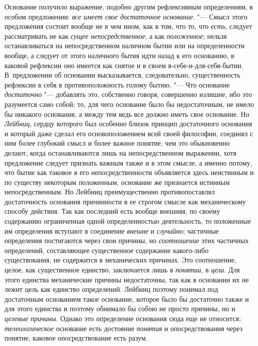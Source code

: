 Основание получило выражение, подобно другим рефлексивным определениям, в
особом предложении: {\em все имеет свое достаточное
основание}. "--- Смысл этого предложения состоит вообще не в чем ином, как в
том, что то, что {\em есть}, следует рассматривать не
как {\em сущее непосредственное}, а как
{\em положенное}; нельзя останавливаться на
непосредственном наличном бытии или на определенности вообще, а следует от
этого наличного бытия идти назад к его основанию, в каковой рефлексии оно
имеется как снятое и в своем в-себе-и-для-себя-бытии. В~предложении об
основании высказывается, следовательно, существенность рефлексии в себя в
противоположность голому бытию. "--- Что основание
{\em достаточно} "--- добавлять это, собственно говоря,
совершенно излишне, ибо это разумеется само собой; то, для чего основание
было бы недостаточным, не имело бы никакого основания, а между тем ведь все
должно иметь свое основание. Но {\em Лейбниц}, сердцу
которого был особенно близок принцип достаточного основания и который даже
сделал его основоположением всей своей философии, соединял с ним более
глубокий смысл и более важное понятие, чем это обыкновенно делают, когда
останавливаются лишь на непосредственном выражении, хотя предложение
следует признать важным также и в этом смысле, а именно потому, что бытие
как таковое в его непосредственности объявляется здесь неистинным и по
существу некоторым положенным, основание же признается истинным
непосредственным. Но Лейбниц преимущественно противопоставлял достаточность
основания причинности в ее строгом смысле как механическому способу
действия. Так как последний есть вообще внешняя, по своему содержанию
ограниченная одной определенностью деятельность, то положенные им
определения вступают в соединение {\em внешне} и
{\em случайно}; частичные определения постигаются через
свои причины, но {\em соотношение} этих частичных
определений, составляющее существенное содержание какого-либо
существования, не содержится в механических причинах. Это соотношение,
целое, как существенное единство, заключается лишь в
{\em понятии}, в {\em цели}. Для
этого единства механические причины недостаточны, так как в основании их не
лежит цель как единство определений. Лейбниц поэтому понимал под
достаточным основанием такое основание, которое было бы достаточно также и
для этого единства и поэтому обнимало бы собою не просто причины, но и
{\em целевые причины}. Однако это определение основания
сюда еще не относится; {\em телеологическое} основание
есть достояние {\em понятия} и опосредствования через
понятие, каковое опосредствование есть разум.


